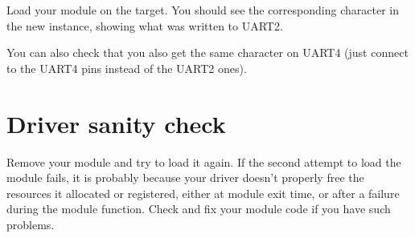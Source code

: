 Load your module on the target. You should see the
corresponding character in the new  instance,
showing what was written to UART2.

You can also check that you also get the same character on UART4
(just connect to the UART4 pins instead of the UART2 ones).

\section{Driver sanity check}

Remove your module and try to load it again. If the second attempt to
load the module fails, it is probably because your driver doesn't
properly free the resources it allocated or registered, either at module
exit time, or after a failure during the module  function. Check
and fix your module code if you have such problems.
